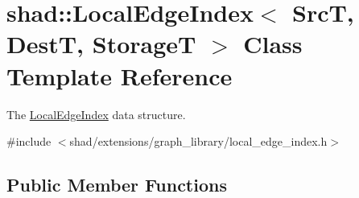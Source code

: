 \hypertarget{classshad_1_1LocalEdgeIndex}{\section{shad\-:\-:Local\-Edge\-Index$<$ Src\-T, Dest\-T, Storage\-T $>$ Class Template Reference}
\label{classshad_1_1LocalEdgeIndex}
}


The \hyperlink{classshad_1_1LocalEdgeIndex}{Local\-Edge\-Index} data structure.  




{\ttfamily \#include $<$shad/extensions/graph\-\_\-library/local\-\_\-edge\-\_\-index.\-h$>$}

\subsection*{Public Member Functions}
